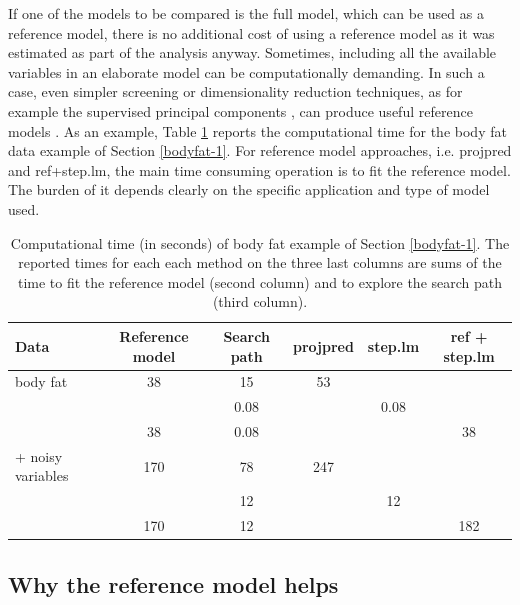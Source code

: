 \documentclass[a4]{article}
\theoremstyle{definition}
\begin{document}
If one of the models to be compared is the full model, which can be
used as a reference model, there is no additional cost of using a
reference model as it was estimated as part of the analysis anyway.
Sometimes, including all the available variables in an
elaborate model can be computationally demanding.  In such a
case, even simpler screening or dimensionality reduction techniques,
as for example the supervised principal components
\citep{bair2006prediction,piironen2018}, can produce useful reference
models \citep{paper:projpred}. As an example, Table \ref{tab:computational_time} reports
the computational time for the body fat data example of Section \ref{bodyfat-1}. 
For reference model approaches, i.e. projpred and ref+step.lm, the main
time consuming operation is to fit the reference model. The burden of it depends clearly
on the specific application and type of model used.

\begin{table}[tp]
	\footnotesize
	\centering
	\begin{tabular}{l|cc|ccc}
		Data & Reference model & Search path & projpred & step.lm & ref + step.lm \\
		\hline
		body fat & 38 & 15 & 53 &  &  \\
		  &  & 0.08 &  & 0.08 &  \\
		  & 38 & 0.08 &  &  & 38 \\
		\hline 
		+ noisy variables & 170 & 78 & 247 &  &  \\
		  & & 12 & & 12 & \\
		  & 170 & 12 & & & 182
		
	\end{tabular}
	\caption{Computational time (in seconds) of body fat example of Section \ref{bodyfat-1}.
		The reported times for each each method on the three last columns are sums of the time to fit the reference model (second column) and
		to explore the search path (third column).}
	\label{tab:computational_time}
\end{table}


\hypertarget{reference-model-approach}{
\subsection{Why the reference model helps}\label{reference-model-approach}}
 
\end{document}
